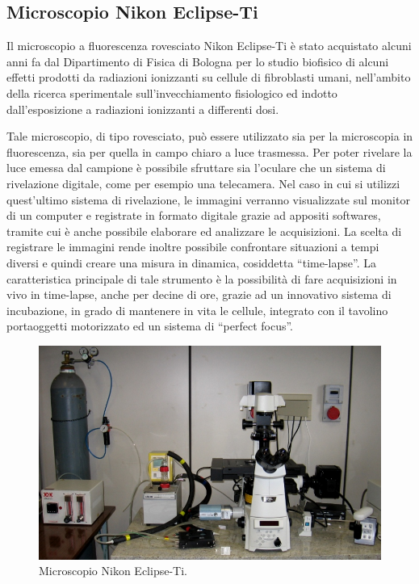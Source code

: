 \subsection{Microscopio Nikon Eclipse-Ti}

Il microscopio a fluorescenza rovesciato Nikon Eclipse-Ti è stato acquistato alcuni anni fa dal Dipartimento di Fisica di Bologna per lo studio biofisico di alcuni effetti prodotti da radiazioni ionizzanti su cellule di fibroblasti umani, nell'ambito della ricerca sperimentale sull'invecchiamento fisiologico ed indotto dall'esposizione a radiazioni ionizzanti a differenti dosi. 

Tale microscopio, di tipo rovesciato, può essere utilizzato sia per la microscopia in fluorescenza, sia per quella in campo chiaro a luce trasmessa.
Per poter rivelare la luce emessa dal campione è possibile sfruttare sia l'oculare che un sistema di rivelazione digitale, come per esempio una telecamera.
Nel caso in cui si utilizzi quest'ultimo sistema di rivelazione, le immagini verranno visualizzate sul monitor di un computer e registrate in formato digitale grazie ad appositi softwares, tramite cui è anche possibile elaborare ed analizzare le acquisizioni. 
La scelta di registrare le immagini rende inoltre possibile confrontare situazioni a tempi diversi e quindi creare una misura in dinamica, cosiddetta ``time-lapse''. 
La caratteristica principale di tale strumento è la possibilità di fare acquisizioni in vivo in time-lapse, anche per decine di ore, grazie ad un innovativo sistema di incubazione, in grado di mantenere in vita le cellule, integrato con il tavolino portaoggetti motorizzato ed un sistema di ``perfect focus''.

\begin{figure}
 \centering
 \includegraphics[scale=.45]{img/CAP2microNIKON.png}
 \caption{\small{Microscopio Nikon Eclipse-Ti.}}
 \label{fig:NIKON}
\end{figure}

